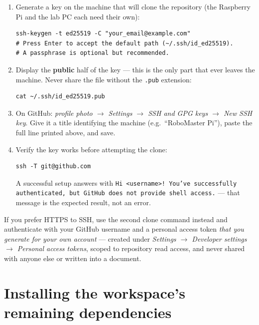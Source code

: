 \documentclass[11pt]{report}
\begin{document}
\begin{enumerate}
  \item Generate a key on the machine that will clone the repository (the
  Raspberry Pi and the lab PC each need their own):

\begin{lstlisting}[style=shell]
ssh-keygen -t ed25519 -C "your_email@example.com"
# Press Enter to accept the default path (~/.ssh/id_ed25519).
# A passphrase is optional but recommended.
\end{lstlisting}

  \item Display the \textbf{public} half of the key --- this is the only
  part that ever leaves the machine. Never share the file without the
  \texttt{.pub} extension:

\begin{lstlisting}[style=shell]
cat ~/.ssh/id_ed25519.pub
\end{lstlisting}

  \item On GitHub: \emph{profile photo $\to$ Settings $\to$ SSH and GPG keys
  $\to$ New SSH key}. Give it a title identifying the machine (e.g.\
  ``RoboMaster Pi''), paste the full line printed above, and save.

  \item Verify the key works before attempting the clone:

\begin{lstlisting}[style=shell]
ssh -T git@github.com
\end{lstlisting}

  A successful setup answers with
  \texttt{Hi <username>! You've successfully authenticated, but GitHub does
  not provide shell access.} --- that message is the expected result, not an
  error.
\end{enumerate}

If you prefer HTTPS to SSH, use the second clone command instead and
authenticate with your GitHub username and a personal access token
\emph{that you generate for your own account} --- created under
\emph{Settings $\to$ Developer settings $\to$ Personal access tokens}, scoped
to repository read access, and never shared with anyone else or written into
a document.

\section{Installing the workspace's remaining dependencies}
\label{sec:rosdep-workspace-deps}
\end{document}
